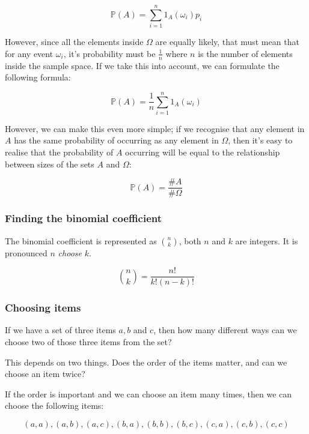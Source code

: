 \begin{dmath*}
	\mathbb{P}(A) = \sum\limits_{i=1}^{n} 1_A(\omega_i)p_i
\end{dmath*}

However, since all the elements inside $\Omega$ are equally likely, that must
mean that for any event $\omega_i$, it's probability must be $\frac{1}{n}$ where
$n$ is the number of elements inside the sample space. If we take this into
account, we can formulate the following formula:

\begin{dmath*}
	\mathbb{P}(A) = \frac{1}{n}\sum\limits_{i=1}^{n} 1_A(\omega_i)
\end{dmath*}


However, we can make this even more simple; if we recognise that any element in
$A$ has the same probability of occurring as any element in $\Omega$, then it's
easy to realise that the probability of $A$ occurring will be equal to the
relationship between sizes of the sets $A$ and $\Omega$:

\begin{dmath*}
	\mathbb{P}(A) = \frac{\#A}{\#\Omega}
\end{dmath*}

\subsubsection{Finding the binomial coefficient}

The binomial coefficient is represented as $n \choose k$, both $n$ and $k$ are
integers. It is pronounced $n$ {\it choose} $k$.

\begin{dmath*}
	{n \choose k} = \frac{n!}{k!(n-k)!}
\end{dmath*}

\subsubsection{Choosing items}

If we have a set of three items $a, b$ and $c$, then how many different ways can
we choose two of those three items from the set?

This depends on two things. Does the order of the items matter, and can we
choose an item twice?

If the order is important and we can choose an item many times, then we can
choose the following items:

\begin{dmath*}
	(a,a), (a,b), (a,c), (b,a), (b,b), (b,c), (c,a), (c,b), (c,c)
\end{dmath*}

